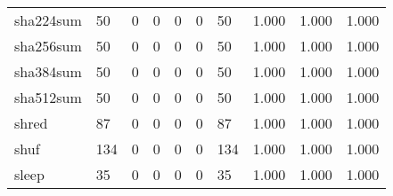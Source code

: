 \begin{longtable}{lp{2.0cm}p{2.0cm}p{2.0cm}p{2.0cm}p{2.0cm}p{2.0cm}p{2.0cm}p{2.0cm}p{2.0cm}}
sha224sum &                     50 &                                             0 &                                            0 &                                           0 &                                            0 &                                         50 &                                1.000 &                                  1.000 &                                1.000 \\
sha256sum &                     50 &                                             0 &                                            0 &                                           0 &                                            0 &                                         50 &                                1.000 &                                  1.000 &                                1.000 \\
sha384sum &                     50 &                                             0 &                                            0 &                                           0 &                                            0 &                                         50 &                                1.000 &                                  1.000 &                                1.000 \\
sha512sum &                     50 &                                             0 &                                            0 &                                           0 &                                            0 &                                         50 &                                1.000 &                                  1.000 &                                1.000 \\
shred     &                     87 &                                             0 &                                            0 &                                           0 &                                            0 &                                         87 &                                1.000 &                                  1.000 &                                1.000 \\
shuf      &                    134 &                                             0 &                                            0 &                                           0 &                                            0 &                                        134 &                                1.000 &                                  1.000 &                                1.000 \\
sleep     &                     35 &                                             0 &                                            0 &                                           0 &                                            0 &                                         35 &                                1.000 &                                  1.000 &                                1.000 \\

\end{longtable}
